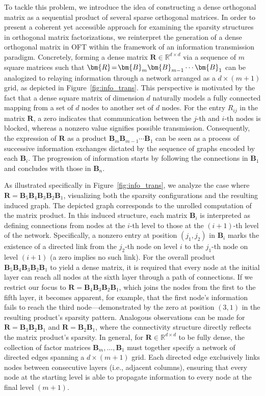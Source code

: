 To tackle this problem, we introduce the idea of constructing a dense orthogonal matrix as a sequential product of several sparse orthogonal matrices. In order to present a coherent yet accessible approach for examining the sparsity structures in orthogonal matrix factorizations, we reinterpret the generation of a dense orthogonal matrix in OFT within the framework of an information transmission paradigm. Concretely, forming a dense matrix $\bm{R}\in\mathbb{R}^{d\times d}$ via a sequence of $m$ square matrices such that $\thickmuskip=2mu \medmuskip=2mu \bm{R}=\bm{B}_m\bm{B}_{m-1}\cdots\bm{B}_1$ can be analogized to relaying information through a network arranged as a $d\times (m+1)$ grid, as depicted in Figure~\ref{fig:info_trans}. This perspective is motivated by the fact that a dense square matrix of dimension $d$ naturally models a fully connected mapping from a set of $d$ nodes to another set of $d$ nodes. For the entry $R_{ij}$ in the matrix $\bm{R}$, a zero indicates that communication between the $j$-th and $i$-th nodes is blocked, whereas a nonzero value signifies possible transmission. Consequently, the expression of $\bm{R}$ as a product $\bm{B}_m\bm{B}_{m-1}\cdots\bm{B}_1$ can be seen as a process of successive information exchanges dictated by the sequence of graphs encoded by each $\bm{B}_i$. The progression of information starts by following the connections in $\bm{B}_1$ and concludes with those in $\bm{B}_n$. 

As illustrated specifically in Figure~\ref{fig:info_trans}, we analyze the case where $\bm{R}=\bm{B}_5\bm{B}_4\bm{B}_3\bm{B}_2\bm{B}_1$, visualizing both the sparsity configurations and the resulting induced graph. The depicted graph corresponds to the unrolled computation of the matrix product. In this induced structure, each matrix $\bm{B}_i$ is interpreted as defining connections from nodes at the $i$-th level to those at the $(i+1)$-th level of the network. Specifically, a nonzero entry at position $(j_1, j_2)$ in $\bm{B}_i$ marks the existence of a directed link from the $j_2$-th node on level $i$ to the $j_1$-th node on level $(i+1)$ (a zero implies no such link). For the overall product $\bm{B}_5\bm{B}_4\bm{B}_3\bm{B}_2\bm{B}_1$ to yield a dense matrix, it is required that every node at the initial layer can reach all nodes at the sixth layer through a path of connections. If we restrict our focus to $\bm{R}=\bm{B}_4\bm{B}_3\bm{B}_2\bm{B}_1$, which joins the nodes from the first to the fifth layer, it becomes apparent, for example, that the first node’s information fails to reach the third node—demonstrated by the zero at position $(3,1)$ in the resulting product’s sparsity pattern. Analogous observations can be made for $\bm{R}=\bm{B}_3\bm{B}_2\bm{B}_1$ and $\bm{R}=\bm{B}_2\bm{B}_1$, where the connectivity structure directly reflects the matrix product's sparsity. In general, for $\bm{R}\in\mathbb{R}^{d\times d}$ to be fully dense, the collection of factor matrices $\bm{B}_m, \dots, \bm{B}_1$ must together specify a network of directed edges spanning a $d\times (m+1)$ grid. Each directed edge exclusively links nodes between consecutive layers (i.e., adjacent columns), ensuring that every node at the starting level is able to propagate information to every node at the final level $(m+1)$.

